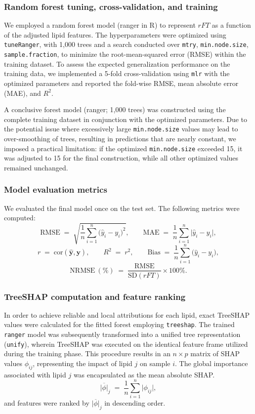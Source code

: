 \documentclass[10pt,letterpaper]{article}
\begin{document}
\subsubsection*{Random forest tuning, cross-validation, and training}
We employed a random forest model (ranger in R) to represent \(rFT\) as a function of the adjusted lipid features. The hyperparameters were optimized using \texttt{tuneRanger}, with 1,000 trees and a search conducted over \texttt{mtry}, \texttt{min.node.size}, \texttt{sample.fraction}, to minimize the root-mean-squared error (RMSE) within the training dataset. To assess the expected generalization performance on the training data, we implemented a 5-fold cross-validation using \texttt{mlr} with the optimized parameters and reported the fold-wise RMSE, mean absolute error (MAE), and \(R^2\).

A conclusive forest model (ranger; 1,000 trees) was constructed using the complete training dataset in conjunction with the optimized parameters. Due to the potential issue where excessively large \texttt{min.node.size} values may lead to over-smoothing of trees, resulting in predictions that are nearly constant, we imposed a practical limitation: if the optimized \texttt{min.node.size} exceeded 15, it was adjusted to 15 for the final construction, while all other optimized values remained unchanged.

\subsubsection*{Model evaluation metrics}
We evaluated the final model once on the test set. The following metrics were computed:
\[
\mathrm{RMSE} \;=\; \sqrt{\frac{1}{n}\sum_{i=1}^{n}\bigl(\hat{y}_i - y_i\bigr)^2}, 
\qquad
\mathrm{MAE} \;=\; \frac{1}{n}\sum_{i=1}^{n}\bigl|\hat{y}_i - y_i\bigr|,
\]
\[
r \;=\; \mathrm{cor}(\hat{\bm{y}}, \bm{y}), 
\qquad
R^2 \;=\; r^2,
\qquad
\mathrm{Bias} \;=\; \frac{1}{n}\sum_{i=1}^{n}\bigl(\hat{y}_i - y_i\bigr),
\]
\[
\mathrm{NRMSE}~(\%) \;=\; \frac{\mathrm{RMSE}}{\mathrm{SD}(rFT)} \times 100\%.
\]

\subsubsection*{TreeSHAP computation and feature ranking}
In order to achieve reliable and local attributions for each lipid, exact TreeSHAP values were calculated for the fitted forest employing \texttt{treeshap}. The trained \texttt{ranger} model was subsequently transformed into a unified tree representation (\texttt{unify}), wherein TreeSHAP was executed on the identical feature frame utilized during the training phase. This procedure results in an \(n \times p\) matrix of SHAP values \(\phi_{ij}\), representing the impact of lipid \(j\) on sample \(i\). The global importance associated with lipid \(j\) was encapsulated as the mean absolute SHAP.\[
\overline{|\phi|}_j \;=\; \frac{1}{n}\sum_{i=1}^{n} \bigl|\phi_{ij}\bigr|,
\]
and features were ranked by \(\overline{|\phi|}_j\) in descending order.
\end{document}
